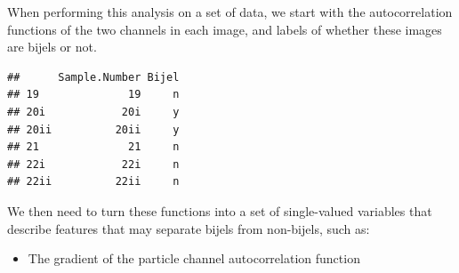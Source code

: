 \documentclass{article}\usepackage[]{graphicx}\usepackage[]{color}
\makeatletter
\newenvironment{kframe}{%
 \def\at@end@of@kframe{}%
 \ifinner\ifhmode%
  \def\at@end@of@kframe{\end{minipage}}%
  \begin{minipage}{\columnwidth}%
 \fi\fi%
 \def\FrameCommand##1{\hskip\@totalleftmargin \hskip-\fboxsep
 \colorbox{shadecolor}{##1}\hskip-\fboxsep
     \hskip-\linewidth \hskip-\@totalleftmargin \hskip\columnwidth}%
 \MakeFramed {\advance\hsize-\width
   \@totalleftmargin\z@ \linewidth\hsize
   \@setminipage}}%
 {\par\unskip\endMakeFramed%
 \at@end@of@kframe}
\newenvironment{knitrout}{}{} %
\makeatother
\begin{document}
When performing this analysis on a set of data, we start with the autocorrelation functions of the two channels in each image, and labels of whether these images are bijels or not.

\begin{knitrout}
\color{fgcolor}\begin{kframe}
\begin{verbatim}
##      Sample.Number Bijel
## 19              19     n
## 20i            20i     y
## 20ii          20ii     y
## 21              21     n
## 22i            22i     n
## 22ii          22ii     n
\end{verbatim}
\end{kframe}
\end{knitrout}

We then need to turn these functions into a set of single-valued variables that describe features that may separate bijels from non-bijels, such as:

\begin{itemize}
\item The gradient of the particle channel autocorrelation function
\end{itemize}
\end{document}
